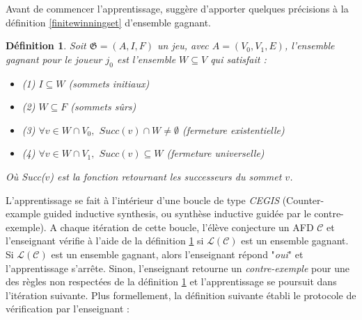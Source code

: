 \documentclass[12pt,a4paper,oneside,titlepage]{report}
\newtheorem{defi}{D\'efinition}[section]
\begin{document}
Avant de commencer l'apprentissage, \cite{NeiderAutomaton} suggère d'apporter quelques précisions à la définition \ref{finitewinningset} d'ensemble gagnant.
\begin{defi}
\label{infinitewinningset}
Soit $\mathfrak{G}=(A,I,F)$ un jeu, avec $A=(V_0, V_1, E)$, l'\emph{ensemble gagnant} pour le joueur $j_0$ est l'ensemble $W\subseteq V$ qui satisfait :
\begin{itemize}
\item (1) $I\subseteq W$ (\emph{sommets initiaux})
\item (2) $W\subseteq F$ (\emph{sommets sûrs})
\item (3) $\forall v\in W\cap V_0,$ $Succ(v)\cap W\neq\emptyset$ (\emph{fermeture existentielle})
\item (4) $\forall v\in W\cap V_1,$ $Succ(v)\subseteq W$ (\emph{fermeture universelle})
\end{itemize}
Où \emph{Succ($v$)} est la fonction retournant les successeurs du sommet $v$.
\end{defi}
L'apprentissage se fait à l'intérieur d'une boucle de type \emph{CEGIS} (Counter-example guided inductive synthesis, ou synthèse inductive guidée par le contre-exemple). A chaque itération de cette boucle, l'élève conjecture un AFD $\mathcal{C}$ et l'enseignant vérifie à l'aide de la définition \ref{infinitewinningset} si $\mathcal{L}(\mathcal{C})$ est un ensemble gagnant. Si $\mathcal{L}(\mathcal{C})$ est un ensemble gagnant, alors l'enseignant répond "\emph{oui}" et l'apprentissage s'arrête. Sinon, l'enseignant retourne un \emph{contre-exemple} pour une des règles non respectées de la définition \ref{infinitewinningset} et l'apprentissage se poursuit dans l'itération suivante. Plus formellement, la définition suivante établi le protocole de vérification par l'enseignant :
\end{document}
